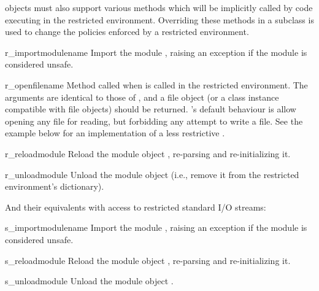  objects must also support various methods which will be
implicitly called by code executing in the restricted environment.
Overriding these methods in a subclass is used to change the policies
enforced by a restricted environment.

\begin{funcdesc}{r_import}{modulename}
Import the module , raising an 
exception if the module is considered unsafe.
\end{funcdesc}

\begin{funcdesc}{r_open}{filename}
Method called when  is called in the restricted
environment.  The arguments are identical to those of ,
and a file object (or a class instance compatible with file objects)
should be returned.  's default behaviour is allow opening
any file for reading, but forbidding any attempt to write a file.  See
the example below for an implementation of a less restrictive
.
\end{funcdesc}

\begin{funcdesc}{r_reload}{module}
Reload the module object , re-parsing and re-initializing it.  
\end{funcdesc}

\begin{funcdesc}{r_unload}{module}
Unload the module object  (i.e., remove it from the
restricted environment's  dictionary).
\end{funcdesc}

And their equivalents with access to restricted standard I/O streams:

\begin{funcdesc}{s_import}{modulename}
Import the module , raising an 
exception if the module is considered unsafe.
\end{funcdesc}

\begin{funcdesc}{s_reload}{module}
Reload the module object , re-parsing and re-initializing it.  
\end{funcdesc}

\begin{funcdesc}{s_unload}{module}
Unload the module object .   
\end{funcdesc}

